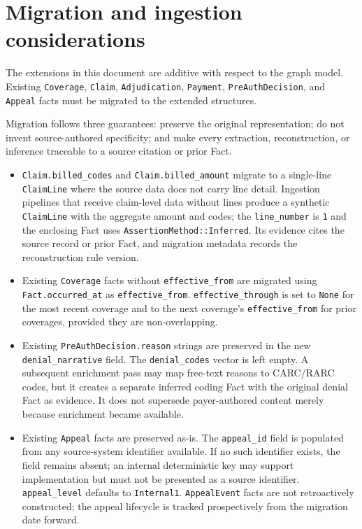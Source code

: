 \documentclass[11pt]{article}
\begin{document}
\section{Migration and ingestion considerations}

The extensions in this document are additive with respect to the graph
model. Existing \texttt{Coverage}, \texttt{Claim}, \texttt{Adjudication},
\texttt{Payment}, \texttt{PreAuthDecision}, and \texttt{Appeal} facts
must be migrated to the extended structures.

Migration follows three guarantees: preserve the original representation;
do not invent source-authored specificity; and make every extraction,
reconstruction, or inference traceable to a source citation or prior Fact.

\begin{itemize}

\item \texttt{Claim.billed\_codes} and \texttt{Claim.billed\_amount}
migrate to a single-line \texttt{ClaimLine} where the source data does
not carry line detail. Ingestion pipelines that receive claim-level data
without lines produce a synthetic \texttt{ClaimLine} with the aggregate
amount and codes; the \texttt{line\_number} is \texttt{1} and the
enclosing Fact uses \texttt{AssertionMethod::Inferred}. Its evidence cites the
source record or prior Fact, and migration metadata records the reconstruction
rule version.

\item Existing \texttt{Coverage} facts without \texttt{effective\_from}
are migrated using \texttt{Fact.occurred\_at} as
\texttt{effective\_from}. \texttt{effective\_through} is set to
\texttt{None} for the most recent coverage and to the next coverage's
\texttt{effective\_from} for prior coverages, provided they are
non-overlapping.

\item Existing \texttt{PreAuthDecision.reason} strings are preserved in
the new \texttt{denial\_narrative} field. The
\texttt{denial\_codes} vector is left empty. A subsequent enrichment
pass may map free-text reasons to CARC/RARC codes, but it creates a separate
inferred coding Fact with the original denial Fact as evidence. It does not
supersede payer-authored content merely because enrichment became available.

\item Existing \texttt{Appeal} facts are preserved as-is. The
\texttt{appeal\_id} field is populated from any source-system
identifier available. If no such identifier exists, the field remains absent;
an internal deterministic key may support implementation but must not be
presented as a source identifier. \texttt{appeal\_level} defaults to
\texttt{Internal1}. \texttt{AppealEvent} facts are not
retroactively constructed; the appeal lifecycle is tracked
prospectively from the migration date forward.


\end{itemize}
\end{document}
